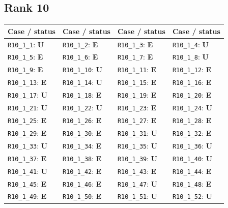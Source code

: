 \subsection*{Rank 10}
\begin{longtable}{llll}
\toprule Case / status & Case / status & Case / status & Case / status \\
\midrule\endhead
\texttt{R10\_1\_1}: \textbf{U} & \texttt{R10\_1\_2}: \textbf{E} & \texttt{R10\_1\_3}: \textbf{E} & \texttt{R10\_1\_4}: \textbf{U} \\
\texttt{R10\_1\_5}: \textbf{E} & \texttt{R10\_1\_6}: \textbf{E} & \texttt{R10\_1\_7}: \textbf{E} & \texttt{R10\_1\_8}: \textbf{U} \\
\texttt{R10\_1\_9}: \textbf{E} & \texttt{R10\_1\_10}: \textbf{U} & \texttt{R10\_1\_11}: \textbf{E} & \texttt{R10\_1\_12}: \textbf{E} \\
\texttt{R10\_1\_13}: \textbf{E} & \texttt{R10\_1\_14}: \textbf{U} & \texttt{R10\_1\_15}: \textbf{E} & \texttt{R10\_1\_16}: \textbf{E} \\
\texttt{R10\_1\_17}: \textbf{U} & \texttt{R10\_1\_18}: \textbf{E} & \texttt{R10\_1\_19}: \textbf{E} & \texttt{R10\_1\_20}: \textbf{E} \\
\texttt{R10\_1\_21}: \textbf{U} & \texttt{R10\_1\_22}: \textbf{U} & \texttt{R10\_1\_23}: \textbf{E} & \texttt{R10\_1\_24}: \textbf{U} \\
\texttt{R10\_1\_25}: \textbf{E} & \texttt{R10\_1\_26}: \textbf{E} & \texttt{R10\_1\_27}: \textbf{E} & \texttt{R10\_1\_28}: \textbf{E} \\
\texttt{R10\_1\_29}: \textbf{E} & \texttt{R10\_1\_30}: \textbf{E} & \texttt{R10\_1\_31}: \textbf{U} & \texttt{R10\_1\_32}: \textbf{E} \\
\texttt{R10\_1\_33}: \textbf{U} & \texttt{R10\_1\_34}: \textbf{E} & \texttt{R10\_1\_35}: \textbf{U} & \texttt{R10\_1\_36}: \textbf{U} \\
\texttt{R10\_1\_37}: \textbf{E} & \texttt{R10\_1\_38}: \textbf{E} & \texttt{R10\_1\_39}: \textbf{U} & \texttt{R10\_1\_40}: \textbf{U} \\
\texttt{R10\_1\_41}: \textbf{U} & \texttt{R10\_1\_42}: \textbf{E} & \texttt{R10\_1\_43}: \textbf{E} & \texttt{R10\_1\_44}: \textbf{E} \\
\texttt{R10\_1\_45}: \textbf{E} & \texttt{R10\_1\_46}: \textbf{E} & \texttt{R10\_1\_47}: \textbf{U} & \texttt{R10\_1\_48}: \textbf{E} \\
\texttt{R10\_1\_49}: \textbf{E} & \texttt{R10\_1\_50}: \textbf{E} & \texttt{R10\_1\_51}: \textbf{U} & \texttt{R10\_1\_52}: \textbf{U} \\

\end{longtable}
